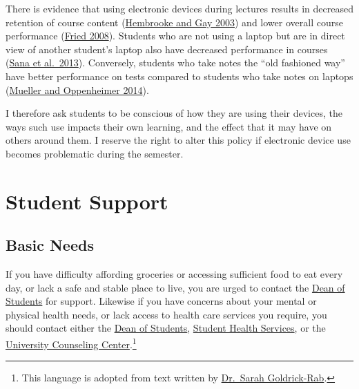 \documentclass[]{book}
\let\rmarkdownfootnote\footnote%
\def\footnote{\protect\rmarkdownfootnote}
\theoremstyle{definition}
\theoremstyle{definition}
\theoremstyle{definition}
\theoremstyle{remark}
\begin{document}
There is evidence that using electronic devices during lectures results
in decreased retention of course content
(\href{https://link.springer.com/article/10.1007/BF02940852}{Hembrooke
and Gay 2003}) and lower overall course performance
(\href{https://www.sciencedirect.com/science/article/pii/S0360131506001436}{Fried
2008}). Students who are not using a laptop but are in direct view of
another student's laptop also have decreased performance in courses
(\href{https://www.sciencedirect.com/science/article/pii/S0360131512002254}{Sana
et al.~2013}). Conversely, students who take notes the ``old fashioned
way'' have better performance on tests compared to students who take
notes on laptops
(\href{http://journals.sagepub.com/doi/abs/10.1177/0956797614524581}{Mueller
and Oppenheimer 2014}).

I therefore ask students to be conscious of how they are using their
devices, the ways such use impacts their own learning, and the effect
that it may have on others around them. I reserve the right to alter
this policy if electronic device use becomes problematic during the
semester.

\hypertarget{student-support}{%
\section{Student Support}\label{student-support}}

\hypertarget{basic-needs}{%
\subsection{Basic Needs}\label{basic-needs}}

If you have difficulty affording groceries or accessing sufficient food
to eat every day, or lack a safe and stable place to live, you are urged
to contact the
\href{https://www.slu.edu/student-development/dean-of-students/index.php}{Dean
of Students} for support. Likewise if you have concerns about your
mental or physical health needs, or lack access to health care services
you require, you should contact either the
\href{https://www.slu.edu/student-development/dean-of-students/index.php}{Dean
of Students},
\href{https://www.slu.edu/life-at-slu/student-health/index.php}{Student
Health Services}, or the
\href{https://www.slu.edu/life-at-slu/university-counseling/index.php}{University
Counseling Center}.\footnote{This language is adopted from text written
  by
  \href{https://medium.com/@saragoldrickrab/basic-needs-security-and-the-syllabus-d24cc7afe8c9}{Dr.~Sarah
  Goldrick-Rab}.}
\end{document}
